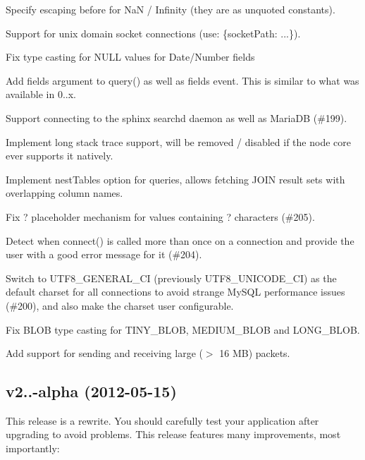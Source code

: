 \begin{DoxyItemize}
\item Specify escaping before for Na\+N / Infinity (they are as unquoted constants).
\item Support for unix domain socket connections (use\+: \{socket\+Path\+: \textquotesingle{}...\textquotesingle{}\}).
\item Fix type casting for N\+U\+L\+L values for Date/\+Number fields
\item Add {\ttfamily fields} argument to {\ttfamily query()} as well as {\ttfamily \textquotesingle{}fields\textquotesingle{}} event. This is similar to what was available in 0..\+x.
\item Support connecting to the sphinx searchd daemon as well as Maria\+D\+B (\#199).
\item Implement long stack trace support, will be removed / disabled if the node core ever supports it natively.
\item Implement {\ttfamily nest\+Tables} option for queries, allows fetching J\+O\+I\+N result sets with overlapping column names.
\item Fix ? placeholder mechanism for values containing \textquotesingle{}?\textquotesingle{} characters (\#205).
\item Detect when {\ttfamily connect()} is called more than once on a connection and provide the user with a good error message for it (\#204).
\item Switch to {\ttfamily U\+T\+F8\+\_\+\+G\+E\+N\+E\+R\+A\+L\+\_\+\+C\+I} (previously {\ttfamily U\+T\+F8\+\_\+\+U\+N\+I\+C\+O\+D\+E\+\_\+\+C\+I}) as the default charset for all connections to avoid strange My\+S\+Q\+L performance issues (\#200), and also make the charset user configurable.
\item Fix B\+L\+O\+B type casting for {\ttfamily T\+I\+N\+Y\+\_\+\+B\+L\+O\+B}, {\ttfamily M\+E\+D\+I\+U\+M\+\_\+\+B\+L\+O\+B} and {\ttfamily L\+O\+N\+G\+\_\+\+B\+L\+O\+B}.
\item Add support for sending and receiving large ($>$ 16 M\+B) packets.
\end{DoxyItemize}

\subsection*{v2..-\/alpha (2012-\/05-\/15)}

This release is a rewrite. You should carefully test your application after upgrading to avoid problems. This release features many improvements, most importantly\+:


